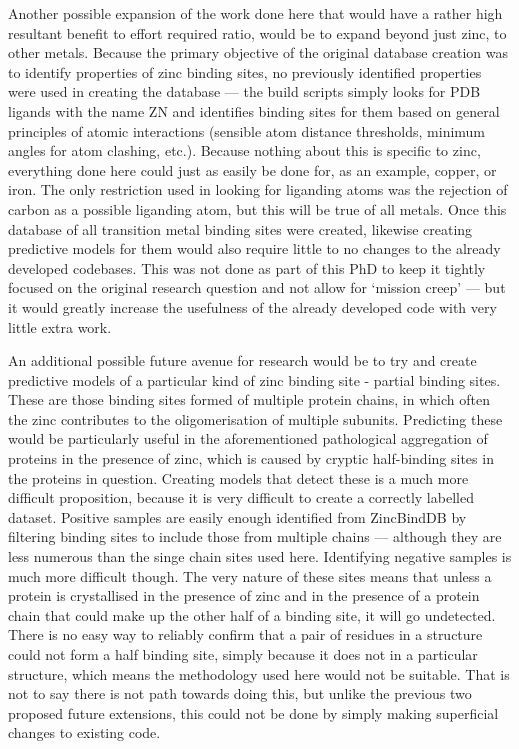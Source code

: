 Another possible expansion of the work done here that would have a rather high resultant benefit to effort required ratio, would be to expand beyond just zinc, to other metals. Because the primary objective of the original database creation was to identify properties of zinc binding sites, no previously identified properties were used in creating the database --- the build scripts simply looks for PDB ligands with the name ZN and identifies binding sites for them based on general principles of atomic interactions (sensible atom distance thresholds, minimum angles for atom clashing, etc.). Because nothing about this is specific to zinc, everything done here could just as easily be done for, as an example, copper, or iron. The only restriction used in looking for liganding atoms was the rejection of carbon as a possible liganding atom, but this will be true of all metals. Once this database of all transition metal binding sites were created, likewise creating predictive models for them would also require little to no changes to the already developed codebases. This was not done as part of this PhD to keep it tightly focused on the original research question and not allow for `mission creep' --- but it would greatly increase the usefulness of the already developed code with very little extra work.

An additional possible future avenue for research would be to try and create predictive models of a particular kind of zinc binding site - partial binding sites. These are those binding sites formed of multiple protein chains, in which often the zinc contributes to the oligomerisation of multiple subunits. Predicting these would be particularly useful in the aforementioned pathological aggregation of proteins in the presence of zinc, which is caused by cryptic half-binding sites in the proteins in question. Creating models that detect these is a much more difficult proposition, because it is very difficult to create a correctly labelled dataset. Positive samples are easily enough identified from ZincBindDB by filtering binding sites to include those from multiple chains --- although they are less numerous than the singe chain sites used here. Identifying negative samples is much more difficult though. The very nature of these sites means that unless a protein is crystallised in the presence of zinc and in the presence of a protein chain that could make up the other half of a binding site, it will go undetected. There is no easy way to reliably confirm that a pair of residues in a structure could not form a half binding site, simply because it does not in a particular structure, which means the methodology used here would not be suitable. That is not to say there is not path towards doing this, but unlike the previous two proposed future extensions, this could not be done by simply making superficial changes to existing code.

